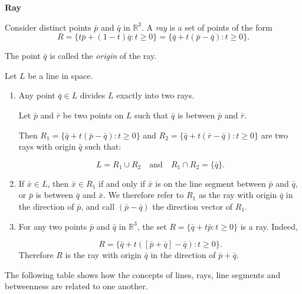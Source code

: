 \begin{definitionbox}
  \textbf{Ray}

  Consider distinct points $\bar{p}$ and $\bar{q}$ in $\mathbb{R}^3$. A \textit{ray} is a set of points of the form
  \[
    R = \{t\bar{p} + (1 - t)\bar{q} : t \geq 0\} =\{\bar{q} + t(\bar{p} - \bar{q}) : t \geq 0\}.
  \]

  The point $\bar{q}$ is called the \textit{origin} of the ray.
\end{definitionbox}

\begin{remarkbox}
  Let $L$ be a line in space.

  \begin{enumerate}
    \item Any point $\bar{q} \in L$ divides $L$ exactly into two rays.

    Let $\bar{p}$ and $\bar{r}$ be two points on $L$ such that $\bar{q}$ is between $\bar{p}$ and $\bar{r}$.
    
    Then $R_1 = \{\bar{q} + t(\bar{p} - \bar{q}) : t \geq 0\}$ and $R_2 = \{\bar{q} + t(\bar{r} - \bar{q}) : t \geq 0\}$ are 
    two rays with origin $\bar{q}$ such that:

    \[
      L = R_1 \cup R_2  \quad \text{and} \quad R_1 \cap R_2 = \{\bar{q}\}.
    \]

    

  \item If $\bar{x} \in L$, then $\bar{x} \in R_1$ if and only if $\bar{x}$ is on the line segment between $\bar{p}$ and $\bar{q}$, or
        $\bar{p}$ is between $\bar{q}$ and $\bar{x}$. We therefore refer to $R_1$ as the ray with origin $\bar{q}$ in the direction of
        $\bar{p}$, and call $(\bar{p} - \bar{q})$ the direction vector of $R_1$.

        
        
  \item For any two points $\bar{p}$ and $\bar{q}$ in $\mathbb{R}^3$, the set $R = \{\bar{q}+t\bar{p} : t \geq 0\}$ is a ray. Indeed,
  
  \[R=\{\bar{q}+t([\bar{p}+\bar{q}] - \bar{q}) : t \geq 0\}.\]
  Therefore $R$ is the ray with origin $\bar{q}$ in the direction of $\bar{p}+\bar{q}$.
  
  \end{enumerate}
\end{remarkbox}

\newpage
The following table shows how the concepts of lines, rays, line segments and betweenness
 are related to one another.
\begin{notebox}
  
\end{notebox}

